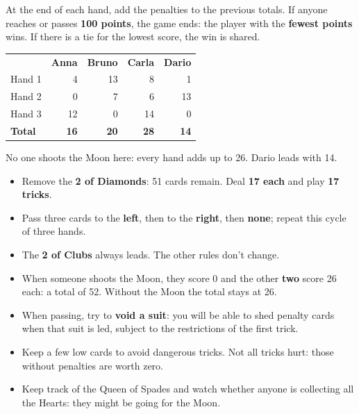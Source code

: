 \documentclass[10pt]{article}
\begin{document}
\startpage
{}
At the end of each hand, add the penalties to the previous totals. If anyone reaches or passes \textbf{100 points}, the game ends: the player with the \textbf{fewest points} wins. If there is a tie for the lowest score, the win is shared.
\begin{center}\small\setlength{\tabcolsep}{2.5mm}\renewcommand{\arraystretch}{1.45}
\begin{tabular}{@{}lrrrr@{}}
\rowcolor{tint}& \textbf{Anna} & \textbf{Bruno} & \textbf{Carla} & \textbf{Dario}\\
Hand 1 & 4 & 13 & 8 & 1\\
Hand 2 & 0 & 7 & 6 & 13\\
Hand 3 & 12 & 0 & 14 & 0\\\hline
\textbf{Total} & \textbf{16} & \textbf{20} & \textbf{28} & \textbf{14}\\
\end{tabular}
\end{center}
No one shoots the Moon here: every hand adds up to 26. Dario leads with 14.
\begin{itemize}
 \item Remove the \textbf{2 of Diamonds}: 51 cards remain. Deal \textbf{17 each} and play \textbf{17 tricks}.
 \item Pass three cards to the \textbf{left}, then to the \textbf{right}, then \textbf{none}; repeat this cycle of three hands.
 \item The \textbf{2 of Clubs} always leads. The other rules don’t change.
 \item When someone shoots the Moon, they score 0 and the other \textbf{two} score 26 each: a total of 52. Without the Moon the total stays at 26.
\end{itemize}
\begin{itemize}
 \item When passing, try to \textbf{void a suit}: you will be able to shed penalty cards when that suit is led, subject to the restrictions of the first trick.
 \item Keep a few low cards to avoid dangerous tricks. Not all tricks hurt: those without penalties are worth zero.
 \item Keep track of the Queen of Spades and watch whether anyone is collecting all the Hearts: they might be going for the Moon.
\end{itemize}
\vfill
{}
\end{document}
